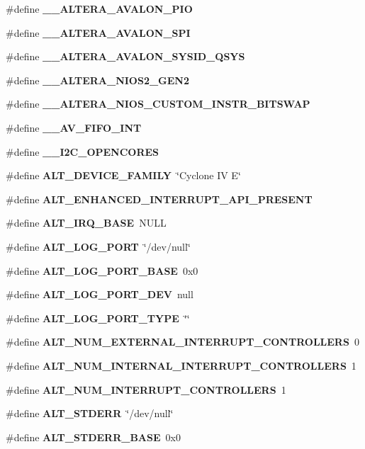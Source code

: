 \begin{DoxyCompactItemize}
\item 
\#define {\bf \+\_\+\+\_\+\+A\+L\+T\+E\+R\+A\+\_\+\+A\+V\+A\+L\+O\+N\+\_\+\+P\+IO}
\item 
\#define {\bf \+\_\+\+\_\+\+A\+L\+T\+E\+R\+A\+\_\+\+A\+V\+A\+L\+O\+N\+\_\+\+S\+PI}
\item 
\#define {\bf \+\_\+\+\_\+\+A\+L\+T\+E\+R\+A\+\_\+\+A\+V\+A\+L\+O\+N\+\_\+\+S\+Y\+S\+I\+D\+\_\+\+Q\+S\+YS}
\item 
\#define {\bf \+\_\+\+\_\+\+A\+L\+T\+E\+R\+A\+\_\+\+N\+I\+O\+S2\+\_\+\+G\+E\+N2}
\item 
\#define {\bf \+\_\+\+\_\+\+A\+L\+T\+E\+R\+A\+\_\+\+N\+I\+O\+S\+\_\+\+C\+U\+S\+T\+O\+M\+\_\+\+I\+N\+S\+T\+R\+\_\+\+B\+I\+T\+S\+W\+AP}
\item 
\#define {\bf \+\_\+\+\_\+\+A\+V\+\_\+\+F\+I\+F\+O\+\_\+\+I\+NT}
\item 
\#define {\bf \+\_\+\+\_\+\+I2\+C\+\_\+\+O\+P\+E\+N\+C\+O\+R\+ES}
\item 
\#define {\bf A\+L\+T\+\_\+\+D\+E\+V\+I\+C\+E\+\_\+\+F\+A\+M\+I\+LY}~\char`\"{}Cyclone IV E\char`\"{}
\item 
\#define {\bf A\+L\+T\+\_\+\+E\+N\+H\+A\+N\+C\+E\+D\+\_\+\+I\+N\+T\+E\+R\+R\+U\+P\+T\+\_\+\+A\+P\+I\+\_\+\+P\+R\+E\+S\+E\+NT}
\item 
\#define {\bf A\+L\+T\+\_\+\+I\+R\+Q\+\_\+\+B\+A\+SE}~N\+U\+LL
\item 
\#define {\bf A\+L\+T\+\_\+\+L\+O\+G\+\_\+\+P\+O\+RT}~\char`\"{}/dev/null\char`\"{}
\item 
\#define {\bf A\+L\+T\+\_\+\+L\+O\+G\+\_\+\+P\+O\+R\+T\+\_\+\+B\+A\+SE}~0x0
\item 
\#define {\bf A\+L\+T\+\_\+\+L\+O\+G\+\_\+\+P\+O\+R\+T\+\_\+\+D\+EV}~null
\item 
\#define {\bf A\+L\+T\+\_\+\+L\+O\+G\+\_\+\+P\+O\+R\+T\+\_\+\+T\+Y\+PE}~\char`\"{}\char`\"{}
\item 
\#define {\bf A\+L\+T\+\_\+\+N\+U\+M\+\_\+\+E\+X\+T\+E\+R\+N\+A\+L\+\_\+\+I\+N\+T\+E\+R\+R\+U\+P\+T\+\_\+\+C\+O\+N\+T\+R\+O\+L\+L\+E\+RS}~0
\item 
\#define {\bf A\+L\+T\+\_\+\+N\+U\+M\+\_\+\+I\+N\+T\+E\+R\+N\+A\+L\+\_\+\+I\+N\+T\+E\+R\+R\+U\+P\+T\+\_\+\+C\+O\+N\+T\+R\+O\+L\+L\+E\+RS}~1
\item 
\#define {\bf A\+L\+T\+\_\+\+N\+U\+M\+\_\+\+I\+N\+T\+E\+R\+R\+U\+P\+T\+\_\+\+C\+O\+N\+T\+R\+O\+L\+L\+E\+RS}~1
\item 
\#define {\bf A\+L\+T\+\_\+\+S\+T\+D\+E\+RR}~\char`\"{}/dev/null\char`\"{}
\item 
\#define {\bf A\+L\+T\+\_\+\+S\+T\+D\+E\+R\+R\+\_\+\+B\+A\+SE}~0x0

\end{DoxyCompactItemize}
